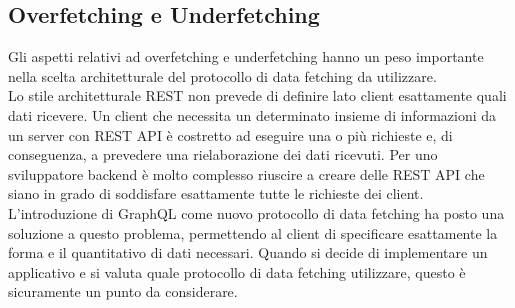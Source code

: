 \subsection{Overfetching e Underfetching}
Gli aspetti relativi ad overfetching e underfetching hanno un peso importante nella scelta architetturale del protocollo di data fetching da utilizzare.\\
Lo stile architetturale REST non prevede di definire lato client esattamente quali dati ricevere. Un client che necessita un determinato insieme di informazioni da un server con REST API è costretto ad eseguire una o più richieste e, di conseguenza, a prevedere una rielaborazione dei dati ricevuti. Per uno sviluppatore backend è molto complesso riuscire a creare delle REST API che siano in grado di soddisfare esattamente tutte le richieste dei client.\\
L'introduzione di GraphQL come nuovo protocollo di data fetching ha posto una soluzione a questo problema, permettendo al client di specificare esattamente la forma e il quantitativo di dati necessari. Quando si decide di implementare un applicativo e si valuta quale protocollo di data fetching utilizzare, questo è sicuramente un punto da considerare.\\
